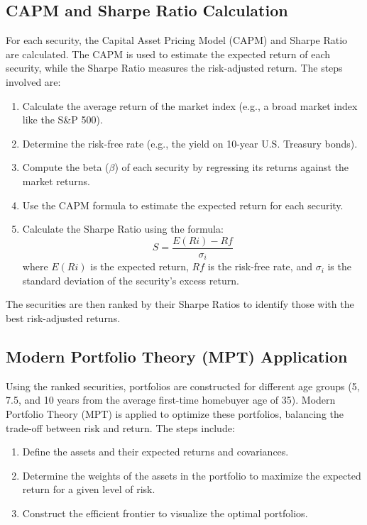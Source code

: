\subsection{CAPM and Sharpe Ratio Calculation}
For each security, the Capital Asset Pricing Model (CAPM) and Sharpe Ratio are calculated. The CAPM is used to estimate the expected return of each security, while the Sharpe Ratio measures the risk-adjusted return. The steps involved are:
\begin{enumerate}
    \item Calculate the average return of the market index (e.g., a broad market index like the S\&P 500).
    \item Determine the risk-free rate (e.g., the yield on 10-year U.S. Treasury bonds).
    \item Compute the beta ($\beta$) of each security by regressing its returns against the market returns.
    \item Use the CAPM formula to estimate the expected return for each security.
    \item Calculate the Sharpe Ratio using the formula:
    \begin{equation}
    S = \frac{E(Ri) - Rf}{\sigma_i}
    \end{equation}
    where $E(Ri)$ is the expected return, $Rf$ is the risk-free rate, and $\sigma_i$ is the standard deviation of the security’s excess return.
\end{enumerate}
The securities are then ranked by their Sharpe Ratios to identify those with the best risk-adjusted returns.

\subsection{Modern Portfolio Theory (MPT) Application}
Using the ranked securities, portfolios are constructed for different age groups (5, 7.5, and 10 years from the average first-time homebuyer age of 35). Modern Portfolio Theory (MPT) is applied to optimize these portfolios, balancing the trade-off between risk and return. The steps include:
\begin{enumerate}
    \item Define the assets and their expected returns and covariances.
    \item Determine the weights of the assets in the portfolio to maximize the expected return for a given level of risk.
    \item Construct the efficient frontier to visualize the optimal portfolios.
\end{enumerate}

